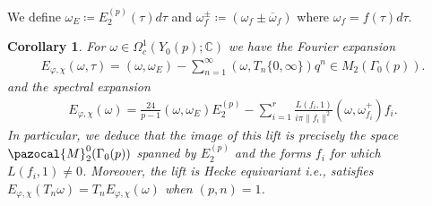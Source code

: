 \documentclass[a4paper,11pt]{amsart} %
\newcommand{\8}{\infty}
\newcommand{\C}{\mathbb{C}}
\newcommand{\Mcal}{\pazocal{M}}
\theoremstyle{mytheoremstyle}
\newtheorem{cor}{Corollary}[thm]
\theoremstyle{remark}
\numberwithin{equation}{section}
\begin{document}
We define $\omega_E \coloneqq E_2^{(p)}(\tau)d\tau$ and $\omega^{\pm}_f \coloneqq (\omega_{f} \pm \overline{\omega}_{f})$ where $\omega_f=f(\tau)d\tau$.

\begin{cor}
For $\omega \in \Omega_c^{1}(Y_0(p);\C)$ we have the Fourier expansion
    \begin{align}
       E_{\varphi, \chi}(\omega,\tau)= (\omega,\omega_E)- \sum_{n=1}^\8( \omega,T_n\{0,\8\} ) q^n \in M_{2}(\Gamma_0(p)).
    \end{align}
and the spectral expansion
\begin{align}
    E_{\varphi, \chi}(\omega) = \frac{24}{p-1} ( \omega , \omega_E ) E_2^{(p)}- \sum_{i=1}^r \frac{L(f_i,1)}{i\pi\lVert f_i \rVert^2}( \omega ,\omega_{f_i}^+ ) f_i.
\end{align}
In particular, we deduce that the image of this lift is precisely the space $\Mcal^0_2(\Gamma_0(p))$ spanned by $E_2^{(p)}$ and the forms $f_i$ for which $L(f_i,1) \neq 0$.
Moreover, the lift is Hecke equivariant {\em i.e.}, satisfies $E_{\varphi, \chi}(T_n\omega) =T_nE_{\varphi, \chi}(\omega)$ when $(p,n)=1$. 
\end{cor}
\end{document}
